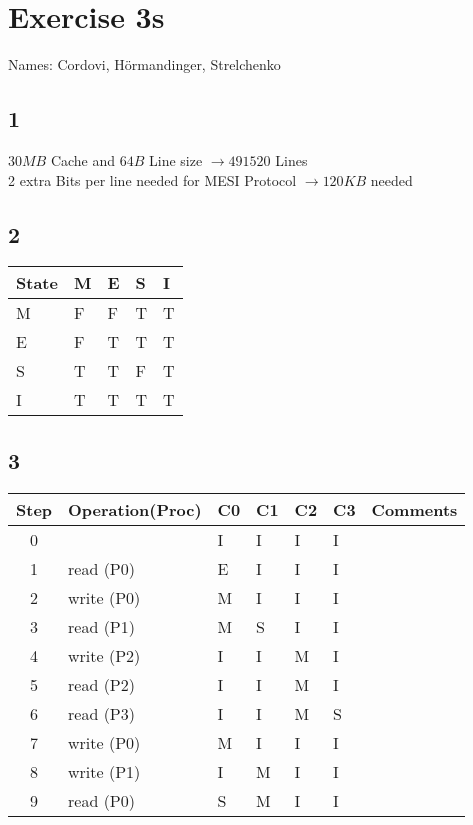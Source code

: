 \documentclass{article}
\begin{document}
\section*{Exercise 3s}
Names: Cordovi, H\"ormandinger, Strelchenko

\subsection*{1} %
$30MB$ Cache and $64B$ Line size $\rightarrow 491520$ Lines\\
2 extra Bits per line needed for MESI Protocol $\rightarrow 120 KB$ needed

\subsection*{2}
\begin{center}
  \begin{tabular}{ | l | l | l | l | l |}
    \hline
    State & M & E & S & I\\ \hline
    M & F & F & T & T \\ \hline
    E & F & T & T & T \\ \hline
    S & T & T & F & T \\ \hline
    I & T & T & T & T \\ \hline
  \end{tabular}
\end{center}


\subsection*{3}

\begin{center}
  \begin{tabular}{ | c | l | l | l | l | l | c |}
    \hline
    Step & Operation(Proc) & C0 & C1 & C2 & C3 & Comments\\ \hline
    0 &  & I & I & I & I & \\ \hline
    1 & read (P0) & E & I & I & I & \\ \hline
    2 & write (P0) & M & I & I & I & \\ \hline
    3 & read (P1) & M & S & I & I & \\ \hline
    4 & write (P2) & I & I & M & I &\\ \hline
    5 & read (P2) & I & I & M & I & \\ \hline
    6 & read (P3) & I & I & M & S & \\ \hline
    7 & write (P0) & M & I & I  & I &\\ \hline
    8 & write (P1) & I & M & I & I & \\ \hline
    9 & read (P0) & S & M & I & I & \\ \hline
  \end{tabular}
\end{center}
\end{document}
